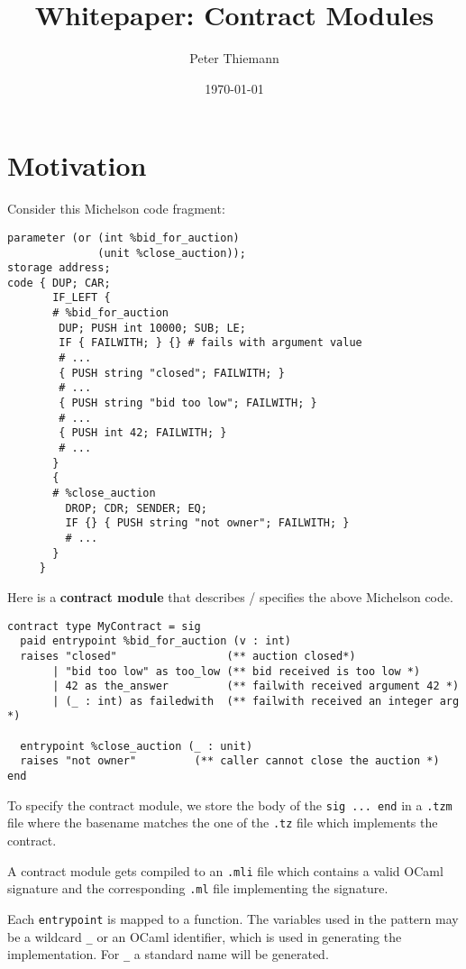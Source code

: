 \documentclass[a4paper]{llncs}
\title{Whitepaper: Contract Modules}
\author{Peter Thiemann}
\institute{}
\date{\today}
\begin{document}
\maketitle
\pagestyle{plain}

\section{Motivation}
\label{sec:motivation}


Consider this Michelson code fragment:
\begin{lstlisting}[language=michelson,caption={Michelson code example},label={lst:code-example}]
parameter (or (int %bid_for_auction)
              (unit %close_auction));
storage address;
code { DUP; CAR; 
       IF_LEFT {
       # %bid_for_auction
        DUP; PUSH int 10000; SUB; LE;
        IF { FAILWITH; } {} # fails with argument value
        # ...
        { PUSH string "closed"; FAILWITH; }
        # ...
        { PUSH string "bid too low"; FAILWITH; }
        # ...
        { PUSH int 42; FAILWITH; }
        # ...
       }
       {
       # %close_auction
         DROP; CDR; SENDER; EQ;
         IF {} { PUSH string "not owner"; FAILWITH; }
         # ...
       }
     }
\end{lstlisting}

Here is a \textbf{contract module} that describes / specifies the above Michelson code.
\begin{lstlisting}[caption={Contract module example},label={lst:contract-module-example}]
contract type MyContract = sig
  paid entrypoint %bid_for_auction (v : int) 
  raises "closed"                 (** auction closed*)
       | "bid too low" as too_low (** bid received is too low *)
       | 42 as the_answer         (** failwith received argument 42 *)
       | (_ : int) as failedwith  (** failwith received an integer arg *)

  entrypoint %close_auction (_ : unit)
  raises "not owner"         (** caller cannot close the auction *)
end
\end{lstlisting}

To specify the contract module, we store
the body of the \lstinline/sig ... end/ in a
\texttt{.tzm} file where the basename matches the one of the
\texttt{.tz} file which implements the contract.

A contract module gets compiled to an \texttt{.mli} file which contains a
valid OCaml signature and the corresponding \texttt{.ml} file
implementing the signature. 

Each \lstinline/entrypoint/ is mapped to a function. The variables
used in the pattern may be a wildcard \lstinline/_/ or an OCaml identifier, which
is used in generating the implementation. For \lstinline/_/ a standard
name will be generated.
\end{document}
